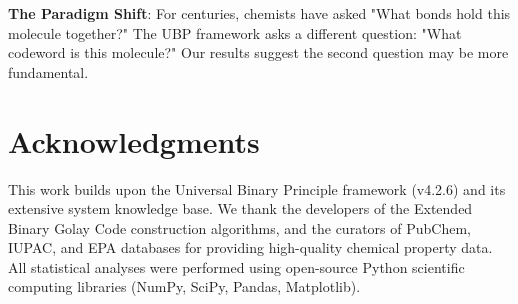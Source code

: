 \documentclass[11pt,letterpaper]{article}
\begin{document}
\textbf{The Paradigm Shift}:
For centuries, chemists have asked "What bonds hold this molecule together?" The UBP framework asks a different question: "What codeword is this molecule?" Our results suggest the second question may be more fundamental.

\section*{Acknowledgments}

This work builds upon the Universal Binary Principle framework (v4.2.6) and its extensive system knowledge base. We thank the developers of the Extended Binary Golay Code construction algorithms, and the curators of PubChem, IUPAC, and EPA databases for providing high-quality chemical property data. All statistical analyses were performed using open-source Python scientific computing libraries (NumPy, SciPy, Pandas, Matplotlib).





\end{document}
